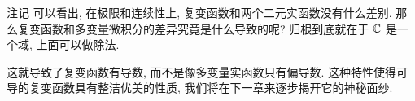 \begin{frame}{注记}
	\onslide<+->
	可以看出, 在极限和连续性上, 复变函数和两个二元实函数没有什么差别.
	\onslide<+->
	那么复变函数和多变量微积分的差异究竟是什么导致的呢?
	\onslide<+->
	归根到底就在于 ${\mathbb{C}}$ 是一个域, 上面可以做除法.

	\onslide<+->
	这就导致了复变函数有\alert{导数}, 而不是像多变量实函数只有偏导数.
	\onslide<+->
	这种特性使得可导的复变函数具有整洁优美的性质, 我们将在下一章来逐步揭开它的神秘面纱.
\end{frame}

